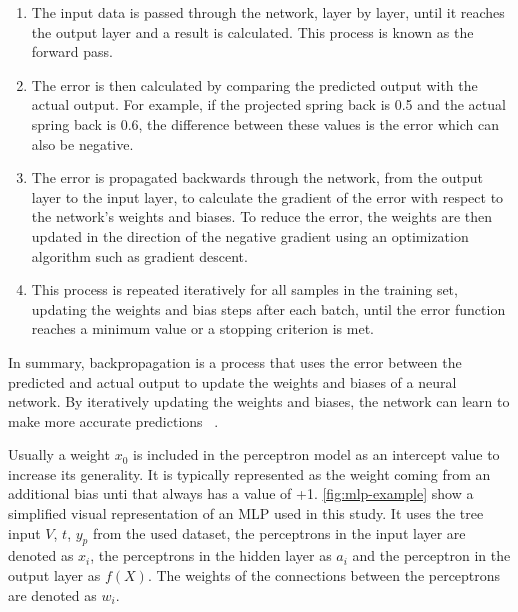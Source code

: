 {\begin{enumerate}
    \item The input data is passed through the network, layer by layer, until it reaches the output layer and a
    result is calculated.
    This process is known as the forward pass.
    \item The error is then calculated by comparing the predicted output with the actual output.
    For example, if the projected spring back is 0.5 and the actual spring back is 0.6, the difference between these
    values is the error which can also be negative.
    \item The error is propagated backwards through the network, from the output layer to the input layer, to
    calculate the gradient of the error with respect to the network's weights and biases. To reduce the error,
    the weights are then updated in the direction of the negative gradient using an optimization algorithm such
    as gradient descent.
    \item This process is repeated iteratively for all
    samples in the training set, updating the weights and bias steps after each batch, until the error function
    reaches a minimum value or a stopping criterion is met.
\end{enumerate}

In summary, backpropagation is a process that uses the error between the predicted and actual output to update the
weights and biases of a neural network.
By iteratively updating the weights and biases, the network can learn to make more accurate predictions
~\cite[p. 53--57]{nielsen_neuralnetworksdeep_2015}.

Usually a weight $x_0$ is included in the perceptron model as an intercept value to increase its generality.
It is typically represented as the weight coming from an additional bias unti that always has a value of +1.
\cref{fig:mlp-example} show a simplified visual representation of an MLP used in this study.
It uses the tree input $V$, $t$, $y_p$ from the used dataset, the perceptrons in the input layer are denoted as $x_i$,
the perceptrons in the hidden layer as $a_i$ and the perceptron in the output layer as $f(X)$.
The weights of the connections between the perceptrons are denoted as $w_i$.

}
